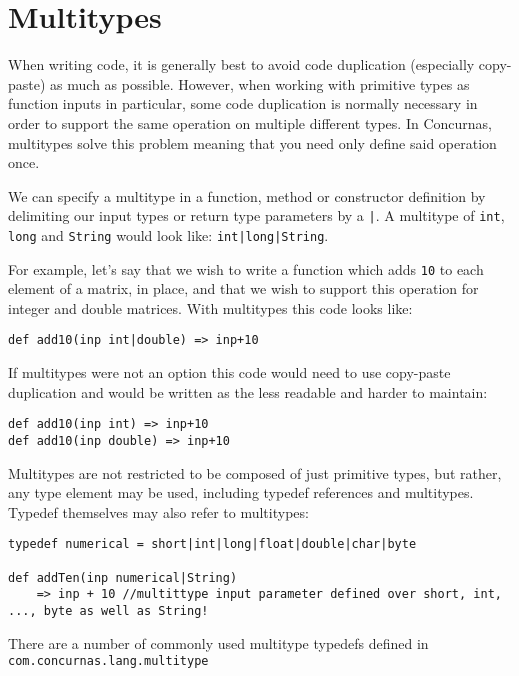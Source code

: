 \documentclass[conc-doc]{subfiles}
\begin{document}
	
	\chapter[Multitypes]{Multitypes}
	
When writing code, it is generally best to avoid code duplication (especially copy-paste) as much as possible. However, when working with primitive types as function inputs in particular, some code duplication is normally necessary in order to support the same operation on multiple different types. In Concurnas, multitypes solve this problem meaning that you need only define said operation once.

We can specify a multitype in a function, method or constructor definition by delimiting our input types or return type parameters by a \lstinline{|}. A multitype of \lstinline{int}, \lstinline{long} and \lstinline{String} would look like: \lstinline{int|long|String}.

For example, let's say that we wish to write a function which adds \lstinline{10} to each element of a matrix, in place, and that we wish to support this operation for integer and double matrices. With multitypes this code looks like:
\begin{lstlisting}
def add10(inp int|double) => inp+10
\end{lstlisting}

If multitypes were not an option this code would need to  use copy-paste duplication and would be written as the less readable and harder to maintain:
\begin{lstlisting}
def add10(inp int) => inp+10
def add10(inp double) => inp+10
\end{lstlisting}

Multitypes are not restricted to be composed of just primitive types, but rather, any type element may be used, including typedef references and multitypes. Typedef themselves may also refer to multitypes:
\begin{lstlisting}
typedef numerical = short|int|long|float|double|char|byte

def addTen(inp numerical|String) 
	=> inp + 10 //multittype input parameter defined over short, int, ..., byte as well as String!
\end{lstlisting}

\begin{sloppypar}
There are a number of commonly used multitype typedefs defined in \lstinline{com.concurnas.lang.multitype}
\end{sloppypar}
\end{document}
